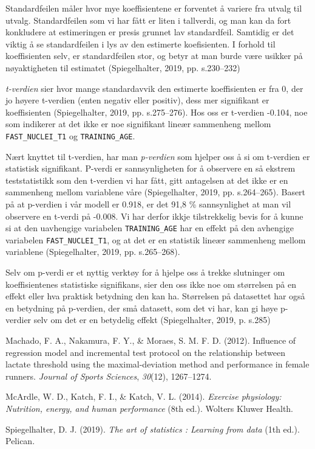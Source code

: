 \documentclass[
  letterpaper,
  DIV=11,
  numbers=noendperiod]{scrartcl}
\newlength{\cslhangindent}
\newenvironment{CSLReferences}[2] %
 {\begin{list}{}{%
  \setlength{\itemindent}{0pt}
  \setlength{\leftmargin}{0pt}
  \setlength{\parsep}{0pt}
  \ifodd #1
   \setlength{\leftmargin}{\cslhangindent}
   \setlength{\itemindent}{-1\cslhangindent}
  \fi
  \setlength{\itemsep}{#2\baselineskip}}}
 {\end{list}}
\begin{document}
Standardfeilen måler hvor mye koeffisientene er forventet å variere fra
utvalg til utvalg. Standardfeilen som vi har fått er liten i tallverdi,
og man kan da fort konkludere at estimeringen er presis grunnet lav
standardfeil. Samtidig er det viktig å se standardfeilen i lys av den
estimerte koefisienten. I forhold til koeffisienten selv, er
standardfeilen stor, og betyr at man burde være usikker på nøyaktigheten
til estimatet (Spiegelhalter, 2019, pp. s.230--232)

\emph{t-verdien} sier hvor mange standardavvik den estimerte
koeffisienten er fra 0, der jo høyere t-verdien (enten negativ eller
positiv), dess mer signifikant er koeffisienten (Spiegelhalter, 2019,
pp. s.275--276). Hos oss er t-verdien -0.104, noe som indikerer at det
ikke er noe signifikant lineær sammenheng mellom
\texttt{FAST\_NUCLEI\_T1} og \texttt{TRAINING\_AGE}.

Nært knyttet til t-verdien, har man \emph{p-verdien} som hjelper oss å
si om t-verdien er statistisk signifikant. P-verdi er sannsynligheten
for å observere en så ekstrem teststatistikk som den t-verdien vi har
fått, gitt antagelsen at det ikke er en sammenheng mellom variablene
våre (Spiegelhalter, 2019, pp. s.264--265). Basert på at p-verdien i vår
modell er 0.918, er det 91,8 \% sannsynlighet at man vil observere en
t-verdi på -0.008. Vi har derfor ikkje tilstrekkelig bevis for å kunne
si at den uavhengige variabelen \texttt{TRAINING\_AGE} har en effekt på
den avhengige variabelen \texttt{FAST\_NUCLEI\_T1}, og at det er en
statistik lineær sammenheng mellom variablene (Spiegelhalter, 2019, pp.
s.265--268).

Selv om p-verdi er et nyttig verktøy for å hjelpe oss å trekke
slutninger om koeffisientenes statistiske signifikans, sier den oss ikke
noe om størrelsen på en effekt eller hva praktisk betydning den kan ha.
Størrelsen på datasettet har også en betydning på p-verdien, der små
datasett, som det vi har, kan gi høye p-verdier selv om det er en
betydelig effekt (Spiegelhalter, 2019, p. s.285)

\label{refs}
\begin{CSLReferences}{1}{0}
Machado, F. A., Nakamura, F. Y., \& Moraes, S. M. F. D. (2012).
Influence of regression model and incremental test protocol on the
relationship between lactate threshold using the maximal-deviation
method and performance in female runners. \emph{Journal of Sports
Sciences}, \emph{30}(12), 1267--1274.

McArdle, W. D., Katch, F. I., \& Katch, V. L. (2014). \emph{Exercise
physiology: Nutrition, energy, and human performance} (8th ed.). Wolters
Kluwer Health.

Spiegelhalter, D. J. (2019). \emph{The art of statistics : Learning from
data} (1th ed.). Pelican.

\end{CSLReferences}
\end{document}
